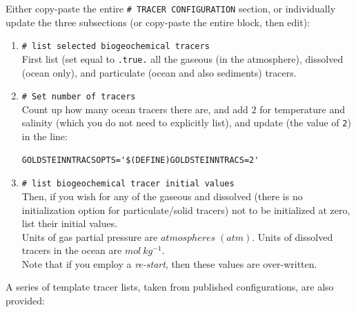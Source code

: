 \vspace{1mm}
Either copy-paste the entire \texttt{\# TRACER\ CONFIGURATION} section, or individually update the three subsections (or copy-paste the entire block, then edit):

\begin{enumerate}[noitemsep]
\vspace{1mm}
\item \texttt{\# list selected biogeochemical tracers}
\\First list (set equal to \texttt{.true.} all the gaseous (in the atmosphere), dissolved (ocean only), and particulate (ocean and also sediments) tracers.
\vspace{1mm}
\item \texttt{\# Set number of tracers}
\\Count up how many ocean tracers there are, and add \(2\) for temperature and salinity (which you do not need to explicitly list), and update (the value of \texttt{2}) in the line:
\footnotesize\begin{verbatim}
GOLDSTEINNTRACSOPTS='$(DEFINE)GOLDSTEINNTRACS=2'
\end{verbatim}\normalsize
\vspace{1mm}
\item \texttt{\# list biogeochemical tracer initial values}
\\Then, if you wish for any of the gaseous and dissolved (there is no initialization option for particulate/solid tracers) not to be initialized at zero, list their initial values.
\\Units of gas partial pressure are \(atmospheres \;(atm)\). Units of dissolved tracers in the ocean are \(mol\:kg^{-1}\).
\\Note that if you employ a \textit{re-start}, then these values are over-written.
\end{enumerate}
\vspace{1mm}

A series of template tracer lists, taken from published configurations, are also provided:

